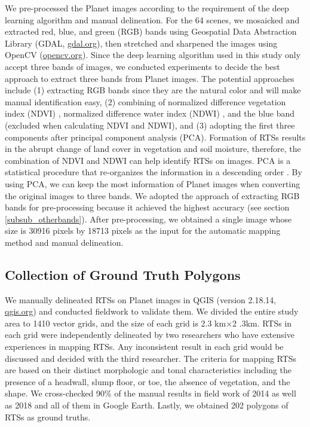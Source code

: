 \documentclass[preprint,12pt,authoryear]{elsarticle}
\begin{document}
We pre-processed the Planet images according to the requirement of the deep learning algorithm and manual delineation. For the 64 scenes, we mosaicked and extracted red, blue, and green (RGB) bands using Geospatial Data Abstraction Library (GDAL, \url{gdal.org}), then stretched and sharpened the images using OpenCV (\url{opencv.org}). Since the deep learning algorithm used in this study only accept three bands of images, we conducted experiments to decide the best approach to extract three bands from Planet images. The potential approaches include (1) extracting RGB bands since they are the natural color and will make manual identification easy, (2) combining of normalized difference vegetation index (NDVI) \citep{rouse1974monitoring}, normalized difference water index (NDWI) \citep{mcfeeters1996use}, and the blue band (excluded when calculating NDVI and NDWI), and (3) adopting the first three components after principal component analysis (PCA). Formation of RTSs results in the abrupt change of land cover in vegetation and soil moisture, therefore, the combination of NDVI and NDWI can help identify RTSs on images. PCA is a statistical procedure that re-organizes the information in a descending order \citep{wold1987principal}. By using PCA, we can keep the most information of Planet images when converting the original images to three bands. We adopted the approach of extracting RGB bands for pre-processing because it achieved the highest accuracy (see section \ref{subsub_otherbands}). After pre-processing, we obtained a single image whose size is 30916 pixels by 18713 pixels as the input for the automatic mapping method and manual delineation. 

\subsection{Collection of Ground Truth Polygons}
\label{subsec_collect_groundtruth}

We manually delineated RTSs on Planet images in QGIS (version 2.18.14, \url{qgis.org}) and conducted fieldwork to validate them. We divided the entire study area to 1410 vector grids, and the size of each grid is 2.3 km$\times$2 .3km. RTSs in each grid were independently delineated by two researchers who have extensive experiences in mapping RTSs. Any inconsistent result in each grid would be discussed and decided with the third researcher. The criteria for mapping RTSs are based on their distinct morphologic and tonal characteristics including the presence of a headwall, slump floor, or toe, the absence of vegetation, and the shape. We cross-checked 90\% of the manual results in field work of 2014 as well as 2018 and all of them in Google Earth. Lastly, we obtained 202 polygons of RTSs as ground truths.  
\end{document}
